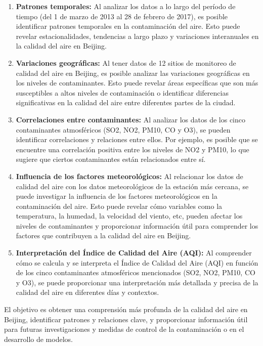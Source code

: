 \begin{enumerate}
    \item \textbf{Patrones temporales:} Al analizar los datos a lo largo del período de tiempo (del 1 de marzo de 2013 al 28 de febrero de 2017), es posible identificar patrones temporales en la contaminación del aire. Esto puede revelar estacionalidades, tendencias a largo plazo y variaciones interanuales en la calidad del aire en Beijing.
    \item \textbf{Variaciones geográficas:} Al tener datos de 12 sitios de monitoreo de calidad del aire en Beijing, es posible analizar las variaciones geográficas en los niveles de contaminantes. Esto puede revelar áreas específicas que son más susceptibles a altos niveles de contaminación o identificar diferencias significativas en la calidad del aire entre diferentes partes de la ciudad.
    \item \textbf{Correlaciones entre contaminantes:} Al analizar los datos de los cinco contaminantes atmosféricos (SO2, NO2, PM10, CO y O3), se pueden identificar correlaciones y relaciones entre ellos. Por ejemplo, es posible que se encuentre una correlación positiva entre los niveles de NO2 y PM10, lo que sugiere que ciertos contaminantes están relacionados entre sí.
    \item \textbf{Influencia de los factores meteorológicos:} Al relacionar los datos de calidad del aire con los datos meteorológicos de la estación más cercana, se puede investigar la influencia de los factores meteorológicos en la contaminación del aire. Esto puede revelar cómo variables como la temperatura, la humedad, la velocidad del viento, etc, pueden afectar los niveles de contaminantes y proporcionar información útil para comprender los factores que contribuyen a la calidad del aire en Beijing.
    \item \textbf{Interpretación del Índice de Calidad del Aire (AQI):} Al comprender cómo se calcula y se interpreta el Índice de Calidad del Aire (AQI) en función de los cinco contaminantes atmosféricos mencionados (SO2, NO2, PM10, CO y O3), se puede proporcionar una interpretación más detallada y precisa de la calidad del aire en diferentes días y contextos.
\end{enumerate}

El objetivo es obtener una comprensión más profunda de la calidad del aire en Beijing, identificar patrones y relaciones clave, y proporcionar información útil para futuras investigaciones y medidas de control de la contaminación o en el desarrollo de modelos.\cite{liang2016spatiotemporal}


